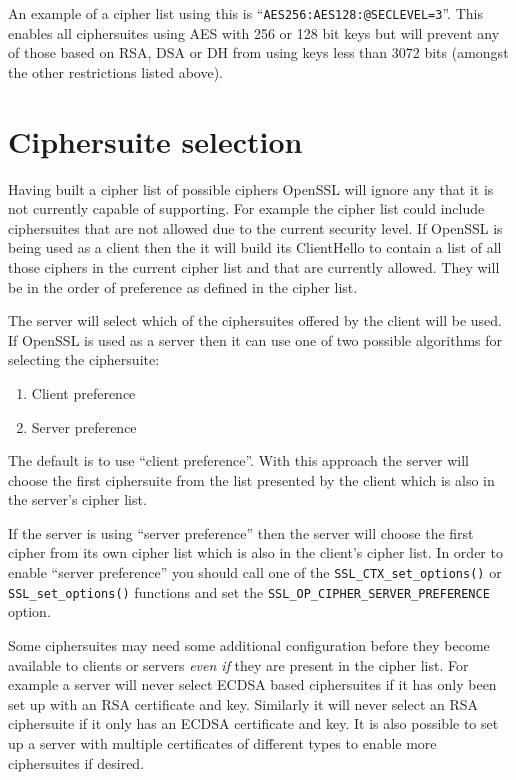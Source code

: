 An example of a cipher list using this is ``\verb!AES256:AES128:@SECLEVEL=3!''.
This enables all ciphersuites using AES with 256 or 128 bit keys but will
prevent any of those based on RSA, DSA or DH from using keys less than 3072
bits (amongst the other restrictions listed above).

\section{Ciphersuite selection}

Having built a cipher list of possible ciphers OpenSSL will ignore any that it
is not currently capable of supporting. For example the cipher list could
include ciphersuites that are not allowed due to the current security level. If
OpenSSL is being used as a client then the it will build its ClientHello to
contain a list of all those ciphers in the current cipher list and that are
currently allowed. They will be in the order of preference as defined in the
cipher list.

The server will select which of the ciphersuites offered by the client will be
used. If OpenSSL is used as a server then it can use one of two possible
algorithms for selecting the ciphersuite:
\begin{enumerate}
\item Client preference
\item Server preference
\end{enumerate}

The default is to use ``client preference''. With this approach the server will
choose the first ciphersuite from the list presented by the client which is
also in the server's cipher list.

If the server is using ``server preference'' then the server will choose the
first cipher from its own cipher list which is also in the client's cipher
list. In order to enable ``server preference'' you should call one of the
\verb!SSL_CTX_set_options()! or \verb!SSL_set_options()! functions and set
the \verb!SSL_OP_CIPHER_SERVER_PREFERENCE! option.

Some ciphersuites may need some additional configuration before they become
available to clients or servers \emph{even if} they are present in the cipher
list. For example a server will never select ECDSA based ciphersuites if
it has only been set up with an RSA certificate and key. Similarly it will never
select an RSA ciphersuite if it only has an ECDSA certificate and key. It
is also possible to set up a server with multiple certificates of different
types to enable more ciphersuites if desired.

